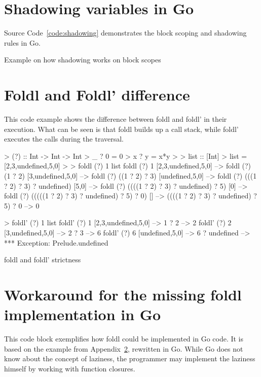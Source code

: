 \section{Shadowing variables in Go}\label{appendix:shadowing}

Source Code~\ref{code:shadowing} demonstrates the block scoping and shadowing rules
in Go.

\begin{code}
	\caption{Example on how shadowing works on block scopes}\label{code:shadowing}
\end{code}

\section{Foldl and Foldl' difference}\label{appendix:foldl-strictness}

This code example shows the difference between foldl and foldl' in their
execution. What can be seen is that foldl builds up a call stack, while
foldl' executes the calls during the traversal.

\begin{code}
    \begin{haskellcode}
> (?) :: Int -> Int -> Int
> _ ? 0 = 0
> x ? y = x*y
>
> list :: [Int]
> list = [2,3,undefined,5,0]
>
> foldl (?) 1 list
foldl (?) 1 [2,3,undefined,5,0] -->
foldl (?) (1 ? 2) [3,undefined,5,0] -->
foldl (?) ((1 ? 2) ? 3) [undefined,5,0] -->
foldl (?) (((1 ? 2) ? 3) ? undefined) [5,0] -->
foldl (?) ((((1 ? 2) ? 3) ? undefined) ? 5) [0] -->
foldl (?) (((((1 ? 2) ? 3) ? undefined) ? 5) ? 0) [] -->
((((1 ? 2) ? 3) ? undefined) ? 5) ? 0 -->
0

> foldl' (?) 1 list
foldl' (?) 1 [2,3,undefined,5,0] -->
    1 ? 2 --> 2
foldl' (?) 2 [3,undefined,5,0] -->
    2 ? 3 --> 6
foldl' (?) 6 [undefined,5,0] -->
    6 ? undefined -->
*** Exception: Prelude.undefined
    \end{haskellcode}
    \caption{foldl and foldl' strictness\autocite{fold-types}}
\end{code}

\section{Workaround for the missing foldl implementation in Go}\label{appendix:foldl-go}

This code block exemplifies how foldl could be implemented in Go code. It is based on the example
from Appendix~\ref{appendix:foldl-strictness}, rewritten in Go. While Go does not know about
the concept of laziness, the programmer may implement the laziness himself by working with function
closures.

